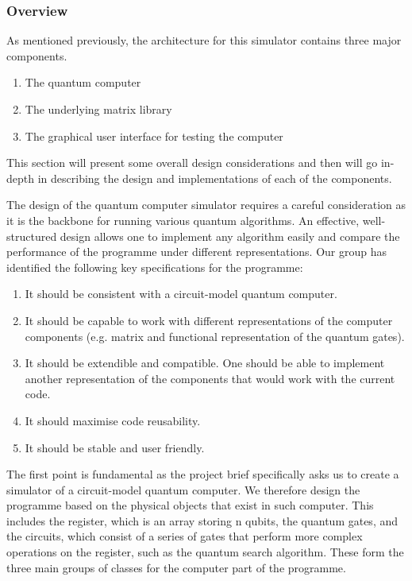 \documentclass[bibliography=totocnumbered, 10pt]{article}
\theoremstyle{NoticeStyle}
\begin{document}
%
\subsubsection{Overview}
As mentioned previously, the architecture for this simulator contains three major components.
\begin{enumerate}
	\item The quantum computer
	\item The underlying matrix library
	\item The graphical user interface for testing the computer
\end{enumerate}
This section will present some overall design considerations and then will go in-depth in describing the design and implementations of each of the components.

The design of the quantum computer simulator requires a careful consideration as it is the backbone for running various quantum algorithms. An effective, well-structured design allows one to implement any algorithm easily and compare the performance of the programme under different representations. Our group has identified the following key specifications for the programme:
\begin{enumerate}
	\item It should be consistent with a circuit-model quantum computer. 
	\item It should be capable to work with different representations of the computer components (e.g. matrix and functional representation of the quantum gates).
	\item It should be extendible and compatible. One should be able to implement another representation of the components that would work with the current code.
	\item It should maximise code reusability.
	\item It should be stable and user friendly.
\end{enumerate}
The first point is fundamental as the project brief specifically asks us to create a simulator of a circuit-model quantum computer. We therefore design the programme based on the physical objects that exist in such computer. This includes the register, which is an array storing n qubits, the quantum gates, and the circuits, which consist of a series of gates that perform more complex operations on the register, such as the quantum search algorithm. These form the three main groups of classes for the computer part of the programme. 
\end{document}
